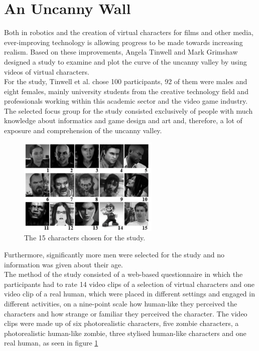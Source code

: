 \section{An Uncanny Wall}
Both in robotics and the creation of virtual characters for films and other media, ever-improving technology is allowing progress to be made towards increasing realism. Based on these improvements, Angela Tinwell and Mark Grimshaw \cite{uncanny_wall} designed a study to examine and plot the curve of the uncanny valley by using videos of virtual characters.\\
For the study, Tinwell et al. chose 100 participants, 92 of them were males and eight females, mainly university students from the creative technology field and professionals working within this academic sector and the video game industry. The selected focus group for the study consisted exclusively of people with much knowledge about informatics and game design and art and, therefore, a lot of exposure and comprehension of the uncanny valley.
\begin{figure} %
    \centering
    \includegraphics[width=0.6\textwidth]{graphics/uncanny_wall.png}
    \caption{The 15 characters chosen for the study.}
    \label{fig:uncannyWall}
\end{figure}
Furthermore, significantly more men were selected for the study and no information was given about their age.\\
The method of the study consisted of a web-based questionnaire in which the participants had to rate 14 video clips of a selection of virtual characters and one video clip of a real human, which were placed in different settings and engaged in different activities, on a nine-point scale how human-like they perceived the characters and how strange or familiar they perceived the character. The video clips were made up of six photorealistic characters, five zombie characters, a photorealistic human-like zombie, three stylised human-like characters and one real human, as seen in figure \ref{fig:uncannyWall}\\

